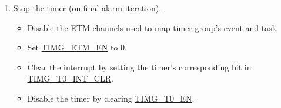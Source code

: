 \documentclass[main\_\_EN.tex]{subfiles}
\begin{document}
\begin{enumerate}
\begin{itemize}
        \item If \hyperref[fielddesc:TIMGTXAUTORELOAD]{TIMG\_T0\_AUTORELOAD} is 0, the current counter value is overwritten by the reloaded value because of the TG0\_TASK\_CNT\_RELOAD\_TIMER0 and TG1\_TASK\_CNT\_RELOAD\_TIMER0. The alarm generation will be reopened by TG0\_TASK\_ALARM\_START\_TIMER0 and TG1\_TASK\_ALARM\_START\_TIMER0.
    \end{itemize}
    \item Stop the timer (on final alarm iteration).
    \begin{itemize}
        \item Disable the ETM channels used to map timer group's event and task
        \item Set \hyperref[fielddesc:TIMGETMEN]{TIMG\_ETM\_EN} to 0.
        \item Clear the interrupt by setting the timer's corresponding bit in \hyperref[fielddesc:TIMGTXINTCLR]{TIMG\_T0\_INT\_CLR}.
        \item Disable the timer by clearing \hyperref[fielddesc:TIMGTXEN]{TIMG\_T0\_EN}.
    \end{itemize}
\end{enumerate}
\end{document}
